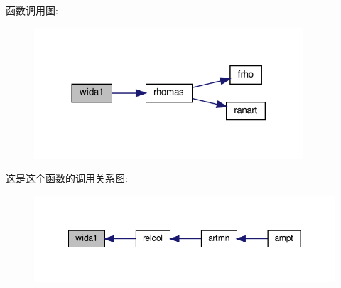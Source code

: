 函数调用图\+:
\nopagebreak
\begin{figure}[H]
\begin{center}
\leavevmode
\includegraphics[width=284pt]{wida1_8f90_a5a6082681397421fa67d1379dab48ded_cgraph}
\end{center}
\end{figure}
这是这个函数的调用关系图\+:
\nopagebreak
\begin{figure}[H]
\begin{center}
\leavevmode
\includegraphics[width=349pt]{wida1_8f90_a5a6082681397421fa67d1379dab48ded_icgraph}
\end{center}
\end{figure}
